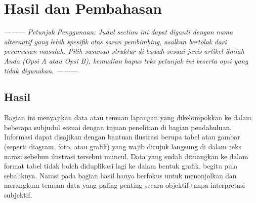 \section{Hasil dan Pembahasan}

\textit{--------- Petunjuk Penggunaan: Judul section ini dapat diganti dengan nama alternatif yang lebih spesifik atas saran pembimbing, asalkan bertolak dari perumusan masalah. Pilih susunan struktur di bawah sesuai jenis artikel ilmiah Anda (Opsi A atau Opsi B), kemudian hapus teks petunjuk ini beserta opsi yang tidak digunakan. ---------}

\subsection{Hasil}

Bagian ini menyajikan data atau temuan lapangan yang dikelompokkan ke dalam beberapa subjudul sesuai dengan tujuan penelitian di bagian pendahuluan. Informasi dapat disajikan dengan bantuan ilustrasi berupa tabel atau gambar (seperti diagram, foto, atau grafik) yang wajib dirujuk langsung di dalam teks narasi sebelum ilustrasi tersebut muncul. Data yang sudah dituangkan ke dalam format tabel tidak boleh diduplikasi lagi ke dalam bentuk grafik, begitu pula sebaliknya. Narasi pada bagian hasil hanya berfokus untuk menonjolkan dan merangkum temuan data yang paling penting secara objektif tanpa interpretasi subjektif.

